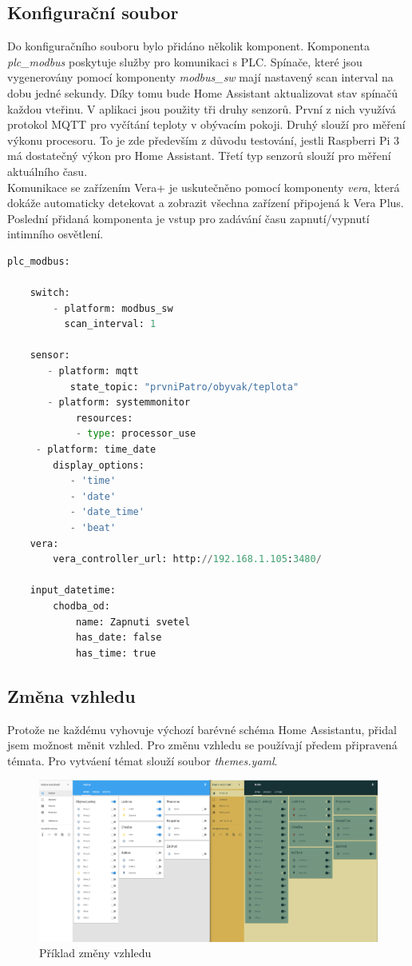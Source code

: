\documentclass[a4paper,12pt,czech,bibliography=totoc]{scrbook}
\begin{document}
	\subsection{Konfigurační soubor}
Do konfiguračního souboru bylo přidáno několik komponent. Komponenta \textit{plc\_modbus} poskytuje služby pro komunikaci s PLC. Spínače, které jsou vygenerovány pomocí komponenty \textit{modbus\_sw} mají nastavený scan interval na dobu jedné sekundy. Díky tomu bude Home Assistant aktualizovat stav spínačů každou vteřinu. V aplikaci jsou použity tři druhy senzorů. První z nich využívá protokol MQTT pro vyčítání teploty v obývacím pokoji. Druhý slouží pro měření výkonu procesoru. To je zde především z důvodu testování, jestli Raspberri Pi 3 má dostatečný výkon pro Home Assistant. Třetí typ senzorů slouží pro měření aktuálního času.\\Komunikace se zařízením Vera+ je uskutečněno pomocí komponenty \textit{vera}, která dokáže automaticky detekovat a zobrazit všechna zařízení připojená k Vera Plus. Poslední přidaná komponenta je vstup pro zadávání času zapnutí/vypnutí intimního osvětlení.
\newpage
			\begin{lstlisting}[language=Python]
	plc_modbus:

	switch:
		- platform: modbus_sw
		  scan_interval: 1

	sensor:
	   - platform: mqtt
		   state_topic: "prvniPatro/obyvak/teplota"
	   - platform: systemmonitor
	    	resources:
	    	- type: processor_use
     - platform: time_date
		display_options:
		   - 'time'
		   - 'date'
		   - 'date_time'
		   - 'beat'
	vera:
		vera_controller_url: http://192.168.1.105:3480/

	input_datetime:
		chodba_od:
			name: Zapnuti svetel
			has_date: false
			has_time: true
	\end{lstlisting}
	
	\subsection{Změna vzhledu}
	Protože ne každému vyhovuje výchozí barévné schéma Home Assistantu, přidal jsem možnost měnit vzhled. Pro změnu vzhledu se používají předem připravená témata.
	\newline
	Pro vytváení témat slouží soubor \textit{themes.yaml}.
	\begin{figure}[h]
		\centering
		\includegraphics[scale = 0.2]{theme.PNG}
		\caption{Příklad změny vzhledu}
		\label{fig:my_label}
	\end{figure}
\end{document}

